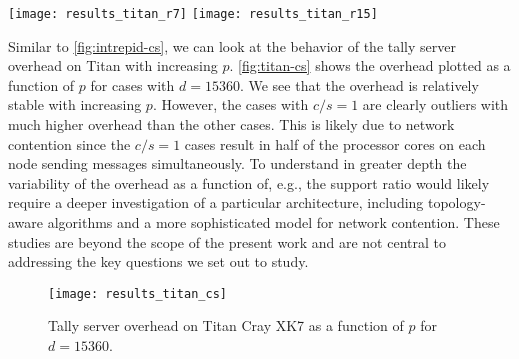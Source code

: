 \documentclass[3p,fleqn]{elsarticle}
\begin{document}
\begin{figure*}[!tbh]
  \begin{floatrow}
     {\texttt{[image: results\_titan\_r7]}}
     {\texttt{[image: results\_titan\_r15]}}
  \end{floatrow}
\end{figure*}

Similar to \autoref{fig:intrepid-cs}, we can look at the behavior of the tally
server overhead on Titan with increasing $p$. \autoref{fig:titan-cs} shows the
overhead plotted as a function of $p$ for cases with $d = 15360$. We see that
the overhead is relatively stable with increasing $p$. However, the cases with
$c/s = 1$ are clearly outliers with much higher overhead than the other
cases. This is likely due to network contention since the $c/s = 1$ cases result
in half of the processor cores on each node sending messages simultaneously. To
understand in greater depth the variability of the overhead as a function of,
e.g., the support ratio would likely require a deeper investigation of a
particular architecture, including topology-aware algorithms and a more
sophisticated model for network contention. These studies are beyond the scope
of the present work and are not central to addressing the key questions we set
out to study.

\begin{figure}[!tbh]
  \centering
  \texttt{[image: results\_titan\_cs]}
  \caption{Tally server overhead on Titan Cray XK7 as a function of $p$ for $d =
    15360$.}
  \label{fig:titan-cs}
\end{figure}
\end{document}
